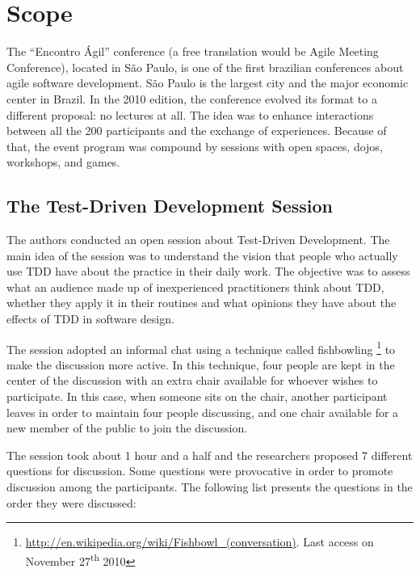 \section{Scope}

The ``Encontro Ágil'' conference (a free translation would be Agile Meeting
Conference), located in São Paulo, is one of the first brazilian conferences about
agile software development. São Paulo is the largest city and the major
economic center in Brazil.
In the 2010 edition, the conference evolved its format to a different proposal:
no lectures at all. The idea was to enhance interactions between all the
200 participants and the exchange of experiences.
Because of that, the event program was compound by sessions with open spaces,
dojos, workshops, and games.

\subsection{The Test-Driven Development Session}

The authors conducted an open session about Test-Driven Development. 
The main idea of the session was to understand the vision that people who
actually use TDD have about the practice in their daily work. The objective
was to assess what an audience made up of inexperienced practitioners
think about TDD, whether they apply it in their routines and what opinions they
have about the effects of TDD in software design.

The session adopted an informal chat using a technique called   
fishbowling \footnote{\url{http://en.wikipedia.org/wiki/Fishbowl_(conversation)}.
Last access on November 27\textsuperscript{th} 2010} to make the discussion more
active.
In this technique, four people are kept in the center of the discussion
with an extra chair available for whoever wishes to participate. In this case,
when someone sits on the chair, another participant leaves in order to
maintain four people discussing, and one chair available for a new
member of the public to join the discussion.

The session took about 1 hour and a half and the researchers proposed 7
different questions for discussion. Some questions were provocative in order
to promote discussion among the participants. 
The following list presents the questions in the order they were discussed:


